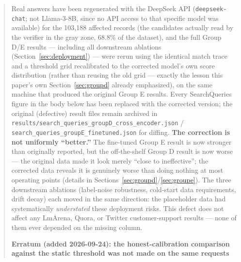 \documentclass[11pt]{article}
\begin{document}
\begin{quote}
\noindent Real answers have been regenerated with the DeepSeek API (\texttt{deepseek-chat}; not Llama-3-8B, since no API access to that specific model was available) for the 103,188 affected records (the candidates actually read by the verifier in the gray zone, 68.8\% of the dataset), and the full Group D/E results --- including all downstream ablations (Section~\ref{sec:deployment}) --- were rerun using the identical match trace and a threshold grid recalibrated to the corrected model's own score distribution (rather than reusing the old grid --- exactly the lesson this paper's own Section~\ref{sec:groupd} already emphasized), on the same machine that produced the original Group E results. Every SearchQueries figure in the body below has been replaced with the corrected version; the original (defective) result files remain archived in \texttt{results/\allowbreak{}search\_\allowbreak{}queries\_\allowbreak{}group\allowbreak{}D\_\allowbreak{}cross\_\allowbreak{}encoder.\allowbreak{}json} / \texttt{search\_\allowbreak{}queries\_\allowbreak{}group\allowbreak{}E\_\allowbreak{}finetuned.\allowbreak{}json} for diffing. \textbf{The correction is not uniformly ``better.''} The fine-tuned Group E result is now stronger than originally reported, but the off-the-shelf Group D result is now worse --- the original data made it look merely ``close to ineffective''; the corrected data reveals it is genuinely worse than doing nothing at most operating points (details in Sections~\ref{sec:groupd}/\ref{sec:groupe}). The three downstream ablations (label-noise robustness, cold-start data requirements, drift decay) each moved in the same direction: the placeholder data had systematically \emph{understated} these deployment risks. This defect does not affect any LmArena, Quora, or Twitter customer-support results --- none of them ever depended on the missing column.

\noindent\textbf{Erratum (added 2026-09-24): the honest-calibration comparison against the static threshold was not made on the same requests}


\end{quote}
\end{document}
